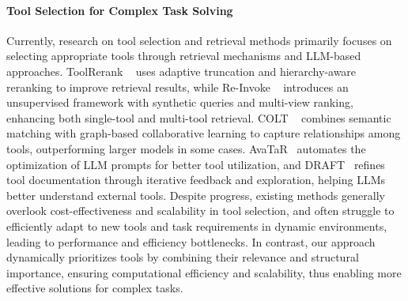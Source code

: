 \paragraph{Tool Selection for Complex Task Solving} Currently, research on tool selection and retrieval methods primarily focuses on selecting appropriate tools through retrieval mechanisms and LLM-based approaches. ToolRerank ~\citep{zheng2024toolrerank} uses adaptive truncation and hierarchy-aware reranking to improve retrieval results, while Re-Invoke ~\citep{chen2024reinvoketool} introduces an unsupervised framework with synthetic queries and multi-view ranking, enhancing both single-tool and multi-tool retrieval. COLT ~\citep{Qu_2024COLT} combines semantic matching with graph-based collaborative learning to capture relationships among tools, outperforming larger models in some cases. AvaTaR~\citep{wu2024avataroptimizingllmagents} automates the optimization of LLM prompts for better tool utilization, and DRAFT~\citep{qu2024DAFT} refines tool documentation through iterative feedback and exploration, helping LLMs better understand external tools. Despite progress, existing methods generally overlook cost-effectiveness and scalability in tool selection, and often struggle to efficiently adapt to new tools and task requirements in dynamic environments, leading to performance and efficiency bottlenecks. In contrast, our approach dynamically prioritizes tools by combining their relevance and structural importance, ensuring computational efficiency and scalability, thus enabling more effective solutions for complex tasks.